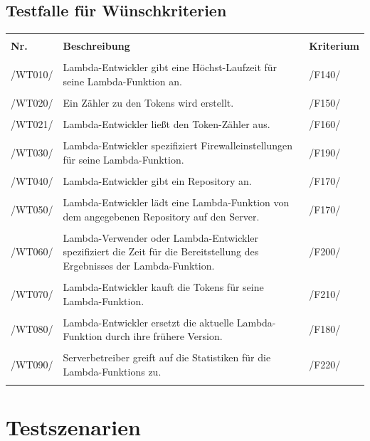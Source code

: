 \documentclass[a4paper,20pt,oneside]{book}
\begin{document}
\subsection{Testfalle für Wünschkriterien}
\begin{longtable}{lp{10cm}p{3cm}}
\hline \\
\textbf{Nr.} & \textbf{Beschreibung} & \textbf{Kriterium} \\ \hline\hline \\ 
/WT010/ & \Gls{Lambda-Entwickler} gibt eine Höchst-Laufzeit für seine \gls{Lambda-Funktion} an. & /F140/ \\ \hline \\
/WT020/ & Ein Zähler zu den \glspl{Token} wird erstellt. & /F150/\\ \hline \\
/WT021/ & \Gls{Lambda-Entwickler} ließt den \gls{Token}-Zähler aus. & /F160/\\ \hline \\
/WT030/ & \Gls{Lambda-Entwickler} spezifiziert Firewalleinstellungen für seine \gls{Lambda-Funktion}. & /F190/\\ \hline \\
/WT040/ & \Gls{Lambda-Entwickler} gibt ein \Gls{Repository} an. & /F170/\\ \hline \\
/WT050/ & \Gls{Lambda-Entwickler} lädt eine \gls{Lambda-Funktion} von dem angegebenen \Gls{Repository} auf den \Gls{Server}. & /F170/\\ \hline \\
/WT060/ & \Gls{Lambda-Verwender} oder \Gls{Lambda-Entwickler} spezifiziert die Zeit für die Bereitstellung des Ergebnisses der \gls{Lambda-Funktion}. & /F200/\\ \hline \\
/WT070/ & \Gls{Lambda-Entwickler} kauft die \glspl{Token} für seine \gls{Lambda-Funktion}. &/F210/\\ \hline \\
/WT080/ & \Gls{Lambda-Entwickler} ersetzt die aktuelle \gls{Lambda-Funktion} durch ihre frühere Version. &/F180/\\ \hline \\
/WT090/ & Serverbetreiber greift auf die Statistiken für die \Glspl{Lambda-Funktion} zu.&/F220/\\ \hline 
\hline
\\
\end{longtable}
\newpage
\section{Testszenarien}
\end{document}
